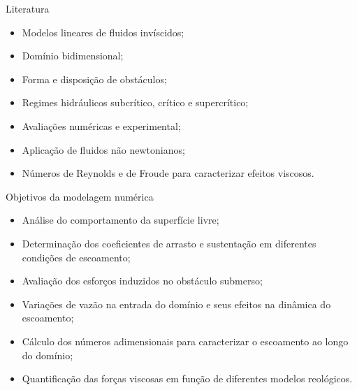 

\begin{frame}{Literatura}
    \begin{itemize}
        \large
        \item Modelos lineares de fluidos invíscidos;
        \item Domínio bidimensional;
        \item Forma e disposição de obstáculos;
        \item Regimes hidráulicos subcrítico, crítico e supercrítico;
        \item Avaliações numéricas e experimental;
        \item Aplicação de fluidos não newtonianos;
        \item Números de Reynolds e de Froude para caracterizar efeitos viscosos.
    \end{itemize}
\end{frame}

\begin{frame}{Objetivos da modelagem numérica}
    \begin{itemize}
        \large
        \item Análise do comportamento da superfície livre;
        \item Determinação dos coeficientes de arrasto e sustentação em diferentes condições de escoamento;
        \item Avaliação dos esforços induzidos no obstáculo submerso;
        \item Variações de vazão na entrada do domínio e seus efeitos na dinâmica do escoamento;
        \item Cálculo dos números adimensionais para caracterizar o escoamento ao longo do domínio;
        \item Quantificação das forças viscosas em função de diferentes modelos reológicos.
    \end{itemize}
\end{frame}